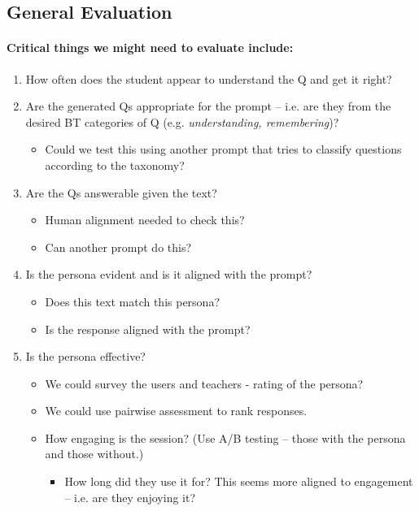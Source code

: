 \documentclass{article}
\begin{document}
\subsection*{General Evaluation}

\paragraph{Critical things we might need to evaluate include:}

\begin{enumerate}
    \item How often does the student appear to understand the Q and get it right?
    \item Are the generated Qs appropriate for the prompt – i.e. are they from the desired BT categories of Q (e.g. \textit{understanding, remembering})?
    \begin{itemize}
        \item Could we test this using another prompt that tries to classify questions according to the taxonomy?
    \end{itemize}
    \item Are the Qs answerable given the text?
    \begin{itemize}
        \item Human alignment needed to check this?
        \item Can another prompt do this?
    \end{itemize}
    \item Is the persona evident and is it aligned with the prompt?
    \begin{itemize}
        \item Does this text match this persona?
        \item Is the response aligned with the prompt?
    \end{itemize}
    \item Is the persona effective?
    \begin{itemize}
        \item We could survey the users and teachers - rating of the persona?
        \item We could use pairwise assessment to rank responses.
        \item How engaging is the session? (Use A/B testing – those with the persona and those without.)
        \begin{itemize}
            \item How long did they use it for? This seems more aligned to engagement – i.e. are they enjoying it?

\end{itemize}
\end{itemize}
\end{enumerate}
\end{document}
